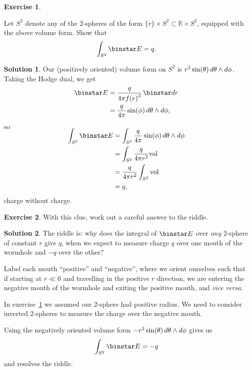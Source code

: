 \documentclass[11pt, a4paper]{report}
\theoremstyle{definition}
\newtheorem{exercise}{Exercise}[part]
\newtheorem{solution}{Solution}[part]
\newenvironment{ex}{\begin{exercise}}{\end{exercise}\pagebreak[1]}
\newenvironment{sol}{\begin{solution}}{\end{solution}\pagebreak[3]}
\renewcommand*{\d}{\ensuremath\mathop{}\mathopen{}d}
\renewcommand*{\star}{\ensuremath\mathop{}\mathopen\binstar\mathord{}}
\begin{document}
\begin{ex}\label{ex:chargewithoutcharge}

Let $S^2$ denote any of the 2-spheres of the form $\{r\} \times S^2 \subset \mathbb{R} \times S^2$, equipped with the above volume form. Show that
\[
    \int_{S^2} \star E = q.
\]

\end{ex}

\begin{sol}

Our (positively oriented) volume form on $S^2$ is $r^2 \sin(\theta) \d \theta \wedge d\phi$.
Taking the Hodge dual, we get
\begin{align*}
    \star E &= \frac{q}{4 \pi {f(r)}^2} \star dr \\
            &= \frac{q}{4 \pi} \sin(\phi) \d \theta \wedge d\phi,
\end{align*}
so
\begin{align*}
    \SwapAboveDisplaySkip
    \int_{S^2} \star E &= \int_{S^2} \frac{q}{4 \pi} \sin(\phi) \d \theta \wedge d\phi \\
        &= \int_{S^2} \frac{q}{4 \pi r^2} \text{vol} \\
        &= \frac{q}{4 \pi r^2} \int_{S^2} \text{vol} \\
        &= q,
\end{align*}
charge without charge.

\end{sol}

\begin{ex}

With this clue, work out a careful answer to the riddle.

\end{ex}

\begin{sol}

The riddle is: why does the integral of $\star E$ over \emph{any} 2-sphere of constant $r$ give $q$, when we expect to measure charge $q$ over  one mouth of the wormhole and $-q$ over the other?

Label each mouth ``positive'' and ``negative'', where we orient ourselves such that if starting at $r \ll 0$ and travelling in the positive $r$ direction, we are entering the negative mouth of the wormhole and exiting the positive mouth, and \emph{vice versa}.

In exercise~\ref{ex:chargewithoutcharge} we assumed our 2-sphere had positive radius.
We need to consider inverted 2-spheres to measure the charge over the negative mouth.

Using the negatively oriented volume form $-r^2 \sin(\theta) \d \theta \wedge d\phi$ gives us
\[
    \int_{S^2} \star E = -q
\]
and resolves the riddle.

\end{sol}
\end{document}
